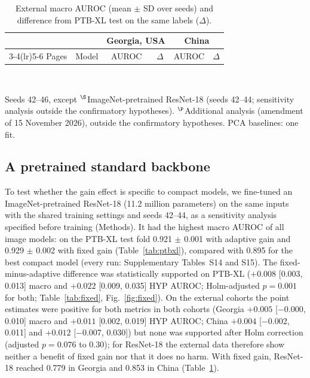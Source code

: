 \documentclass{wlscirep}
\begin{document}
\begin{table}[!t]
\centering
\caption{External macro AUROC (mean $\pm$ SD over seeds) and difference from PTB-XL test on the same labels ($\Delta$).}
\label{tab:external}
\small
\begin{tabular}{llcccc}
\toprule
& & \multicolumn{2}{c}{Georgia, USA} & \multicolumn{2}{c}{China} \\
\cmidrule(lr){3-4}\cmidrule(lr){5-6}
Pages & Model & AUROC & $\Delta$ & AUROC & $\Delta$ \\
\midrule

\bottomrule
\end{tabular}\\[2pt]
\begin{minipage}{0.95\textwidth}\scriptsize
Seeds 42--46, except $^\S$ImageNet-pretrained ResNet-18 (seeds 42--44; sensitivity analysis outside the confirmatory hypotheses). $^\P$Additional analysis (amendment of 15 November 2026), outside the confirmatory hypotheses. PCA baselines: one fit.
\end{minipage}
\end{table}

\subsection*{A pretrained standard backbone}
To test whether the gain effect is specific to compact models, we fine-tuned an ImageNet-pretrained ResNet-18 \cite{he2016resnet} (11.2 million parameters) on the same inputs with the shared training settings and seeds 42--44, as a sensitivity analysis specified before training (Methods). It had the highest macro AUROC of all image models: on the PTB-XL test fold 0.921 $\pm$ 0.001 with adaptive gain and 0.929 $\pm$ 0.002 with fixed gain (Table~\ref{tab:ptbxl}), compared with 0.895 for the best compact model (every run: Supplementary Tables~S14 and S15). The fixed-minus-adaptive difference was statistically supported on PTB-XL ($+0.008$ [0.003, 0.013] macro and $+0.022$ [0.009, 0.035] HYP AUROC; Holm-adjusted $p=0.001$ for both; Table~\ref{tab:fixed}, Fig.~\ref{fig:fixed}). On the external cohorts the point estimates were positive for both metrics in both cohorts (Georgia $+0.005$ [$-$0.000, 0.010] macro and $+0.011$ [0.002, 0.019] HYP AUROC; China $+0.004$ [$-$0.002, 0.011] and $+0.012$ [$-$0.007, 0.030]) but none was supported after Holm correction (adjusted $p=0.076$ to $0.30$); for ResNet-18 the external data therefore show neither a benefit of fixed gain nor that it does no harm. With fixed gain, ResNet-18 reached 0.779 in Georgia and 0.853 in China (Table~\ref{tab:external}).
\end{document}
